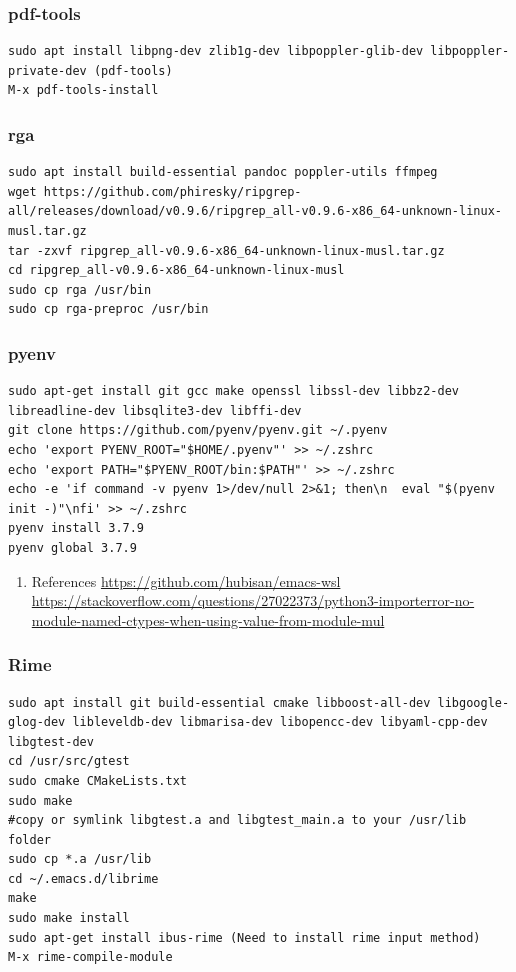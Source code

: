 \documentclass[11pt]{article}
\begin{document}
\subsubsection{pdf-tools}
\label{sec:org9dc8a79}
\begin{verbatim}
sudo apt install libpng-dev zlib1g-dev libpoppler-glib-dev libpoppler-private-dev (pdf-tools)
M-x pdf-tools-install
\end{verbatim}

\subsubsection{rga}
\label{sec:orge344e04}
\begin{verbatim}
sudo apt install build-essential pandoc poppler-utils ffmpeg
wget https://github.com/phiresky/ripgrep-all/releases/download/v0.9.6/ripgrep_all-v0.9.6-x86_64-unknown-linux-musl.tar.gz
tar -zxvf ripgrep_all-v0.9.6-x86_64-unknown-linux-musl.tar.gz
cd ripgrep_all-v0.9.6-x86_64-unknown-linux-musl
sudo cp rga /usr/bin
sudo cp rga-preproc /usr/bin
\end{verbatim}

\subsubsection{pyenv}
\label{sec:org5ebb7f0}
\begin{verbatim}
sudo apt-get install git gcc make openssl libssl-dev libbz2-dev libreadline-dev libsqlite3-dev libffi-dev
git clone https://github.com/pyenv/pyenv.git ~/.pyenv
echo 'export PYENV_ROOT="$HOME/.pyenv"' >> ~/.zshrc
echo 'export PATH="$PYENV_ROOT/bin:$PATH"' >> ~/.zshrc
echo -e 'if command -v pyenv 1>/dev/null 2>&1; then\n  eval "$(pyenv init -)"\nfi' >> ~/.zshrc
pyenv install 3.7.9
pyenv global 3.7.9
\end{verbatim}
\begin{enumerate}
\item References
\label{sec:orge9ba752}
\url{https://github.com/hubisan/emacs-wsl}
\url{https://stackoverflow.com/questions/27022373/python3-importerror-no-module-named-ctypes-when-using-value-from-module-mul}
\end{enumerate}

\subsubsection{Rime}
\label{sec:orgcd8b763}
\begin{verbatim}
sudo apt install git build-essential cmake libboost-all-dev libgoogle-glog-dev libleveldb-dev libmarisa-dev libopencc-dev libyaml-cpp-dev libgtest-dev
cd /usr/src/gtest
sudo cmake CMakeLists.txt
sudo make
#copy or symlink libgtest.a and libgtest_main.a to your /usr/lib folder
sudo cp *.a /usr/lib
cd ~/.emacs.d/librime
make
sudo make install
sudo apt-get install ibus-rime (Need to install rime input method)
M-x rime-compile-module
\end{verbatim}
\end{document}
